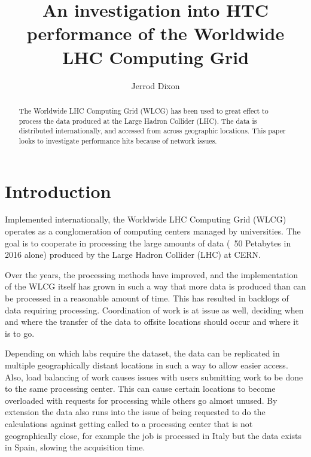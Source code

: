 \documentclass[print,ms]{nuthesis}
\begin{document}
\frontmatter
\title{An investigation into HTC performance of the Worldwide LHC Computing Grid}
\author{Jerrod Dixon}

\maketitle

\begin{abstract}
The Worldwide LHC Computing Grid (WLCG) has been used to great effect to process the data produced at the Large Hadron Collider (LHC). The data is distributed internationally, and accessed from across geographic locations. This paper looks to investigate performance hits because of network issues.
\end{abstract}

\begin{acknowledgments}
	
\end{acknowledgments}


\tableofcontents
\newpage
\listoffigures
\listoftables

\mainmatter
\chapter{Introduction}
\label{sec:Introduction}
Implemented internationally, the Worldwide LHC Computing Grid (WLCG)\cite{wlcg} operates as a conglomeration of computing centers managed by universities. The goal is to cooperate in processing the large amounts of data (~50 Petabytes in 2016 alone) produced by the Large Hadron Collider (LHC) at CERN.

Over the years, the processing methods have improved, and the implementation of the WLCG itself has grown in such a way that more data is produced than can be processed in a reasonable amount of time. This has resulted in backlogs of data requiring processing. Coordination of work is at issue as well, deciding when and where the transfer of the data to offsite locations should occur and where it is to go. 

Depending on which labs require the dataset, the data can be replicated in multiple geographically distant locations in such a way to allow easier access. Also, load balancing of work causes issues with users submitting work to be done to the same processing center. This can cause certain locations to become overloaded with requests for processing while others go almost unused. By extension the data also runs into the issue of being requested to do the calculations against getting called to a processing center that is not geographically close, for example the job is processed in Italy but the data exists in Spain, slowing the acquisition time. 
\end{document}

